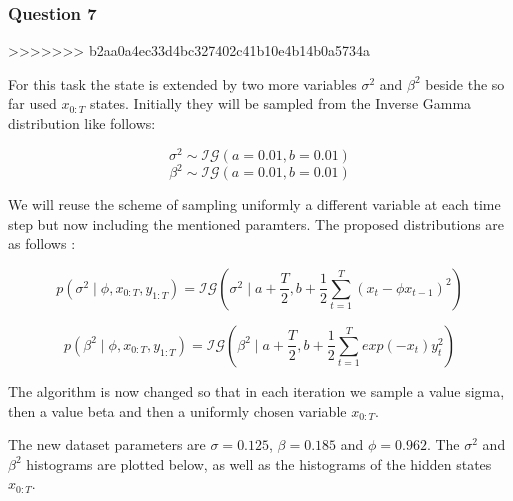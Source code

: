 \documentclass[]{article}
\begin{document}
	\subsubsection{Question 7}
>>>>>>> b2aa0a4ec33d4bc327402c41b10e4b14b0a5734a
	
	For this task the state is extended by two more variables $\sigma^2$ and $\beta^2$ beside the so far used $x_{0:T}$ states. Initially they will be sampled from the Inverse Gamma distribution like follows:
	
	$$ \sigma^2 \sim \mathcal{IG}(a = 0.01, b = 0.01)$$
	$$ \beta^2 \sim \mathcal{IG}(a = 0.01, b = 0.01)$$
	
	
	We will reuse the scheme of sampling uniformly a different variable at each time step but now including the mentioned paramters. The proposed distributions are as follows :
	
	$$ p(\sigma^2 \mid \phi, x_{0:T}, y_{1:T} ) = \mathcal{IG} \left( \sigma^2 \mid a+\frac{T}{2}, b + \frac{1}{2} \sum_{t=1}^T (x_t - \phi x_{t-1})^2 \right) $$
	
	$$ p(\beta^2 \mid \phi, x_{0:T}, y_{1:T} ) = \mathcal{IG} \left( \beta^2 \mid a+\frac{T}{2}, b + \frac{1}{2} \sum_{t=1}^T exp(-x_t)y_t^2 \right) $$
	
	The algorithm is now changed so that in each iteration we sample a value sigma, then a value beta and then a uniformly chosen variable $x_{0:T}$. 
	
	The new dataset parameters are $\sigma = 0.125$, $\beta = 0.185 $ and $\phi=0.962$. The $\sigma^2$ and $\beta^2$ histograms are plotted below, as well as the histograms of the hidden states $x_{0:T}$.
	
\end{document}
